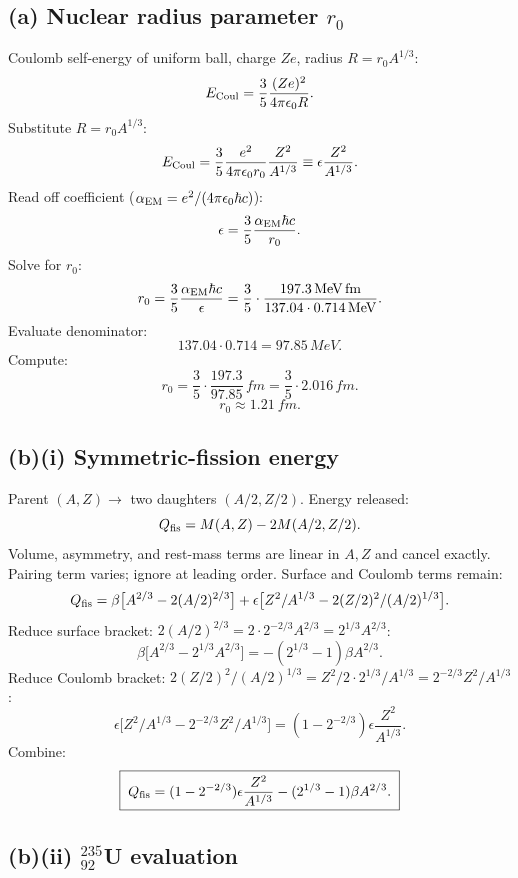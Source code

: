 \documentclass[11pt]{article}
\begin{document}
\subsection*{(a) Nuclear radius parameter $r_0$}

Coulomb self-energy of uniform ball, charge $Ze$, radius $R=r_0 A^{1/3}$:
\[
E_{\rm Coul}=\frac{3}{5}\frac{(Ze)^{2}}{4\pi\epsilon_0 R}.
\]
Substitute $R=r_0 A^{1/3}$:
\[
E_{\rm Coul}=\frac{3}{5}\frac{e^{2}}{4\pi\epsilon_0 r_0}\frac{Z^{2}}{A^{1/3}}\equiv \epsilon\frac{Z^{2}}{A^{1/3}}.
\]
Read off coefficient ($\alpha_{\rm EM}=e^{2}/(4\pi\epsilon_0\hbar c)$):
\[
\epsilon=\frac{3}{5}\frac{\alpha_{\rm EM}\hbar c}{r_0}.
\]
Solve for $r_0$:
\[
r_0=\frac{3}{5}\frac{\alpha_{\rm EM}\hbar c}{\epsilon}=\frac{3}{5}\cdot\frac{\SI{197.3}{MeV.fm}}{137.04\cdot \SI{0.714}{MeV}}.
\]
Evaluate denominator:
\[
137.04\cdot 0.714=97.85\,\si{MeV}.
\]
Compute:
\[
r_0=\frac{3}{5}\cdot\frac{197.3}{97.85}\,\si{fm}=\frac{3}{5}\cdot 2.016\,\si{fm}.
\]
\begin{equation}
\boxed{\;r_0\approx \SI{1.21}{fm}.\;}
\label{eq:r0}
\end{equation}

\subsection*{(b)(i) Symmetric-fission energy}

Parent $(A,Z)\to$ two daughters $(A/2,Z/2)$. Energy released:
\[
Q_{\rm fis}=M(A,Z)-2M(A/2,Z/2).
\]
Volume, asymmetry, and rest-mass terms are linear in $A,Z$ and cancel exactly. Pairing term varies; ignore at leading order. Surface and Coulomb terms remain:
\[
Q_{\rm fis}=\beta\bigl[A^{2/3}-2(A/2)^{2/3}\bigr]+\epsilon\bigl[Z^{2}/A^{1/3}-2(Z/2)^{2}/(A/2)^{1/3}\bigr].
\]
Reduce surface bracket: $2(A/2)^{2/3}=2\cdot 2^{-2/3}A^{2/3}=2^{1/3}A^{2/3}$:
\[
\beta\bigl[A^{2/3}-2^{1/3}A^{2/3}\bigr]=-(2^{1/3}-1)\beta A^{2/3}.
\]
Reduce Coulomb bracket: $2(Z/2)^{2}/(A/2)^{1/3}=Z^{2}/2\cdot 2^{1/3}/A^{1/3}=2^{-2/3}Z^{2}/A^{1/3}$:
\[
\epsilon\bigl[Z^{2}/A^{1/3}-2^{-2/3}Z^{2}/A^{1/3}\bigr]=(1-2^{-2/3})\epsilon\frac{Z^{2}}{A^{1/3}}.
\]
Combine:
\begin{equation}
\boxed{\;Q_{\rm fis}=(1-2^{-2/3})\epsilon\frac{Z^{2}}{A^{1/3}}-(2^{1/3}-1)\beta A^{2/3}.\;}
\label{eq:Qfis}
\end{equation}

\subsection*{(b)(ii) $^{235}_{92}$U evaluation}
\end{document}
